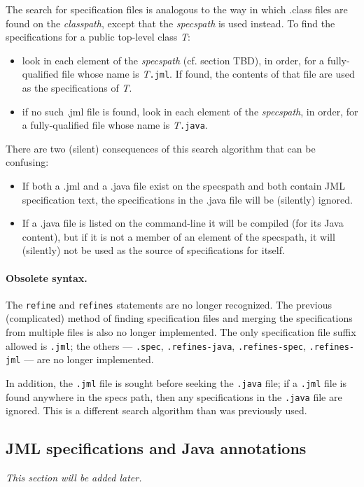 The search for specification files is analogous to the way in  which .class files are found on the {\it classpath}, except that the {\it specspath} is used instead. To find the specifications for a public top-level class {\it T}:
\begin{itemize} 
\item look in each element of the {\it specspath} (cf. section TBD), in order, for a fully-qualified file whose name is {\it T}{\tt .jml}.
If found, the contents of that file are used as the specifications of {\it T}.
\item if no such .jml file is found, look in each element of the {\it specspath}, in order, for a fully-qualified file whose name is {\it T}{\tt .java}.
\end{itemize}
There are two (silent) consequences of this search algorithm that can be confusing:
\begin{itemize}
\item If both a .jml and a .java file exist on the specspath and both contain JML specification text, the specifications in the .java file will be (silently) ignored.
\item If a .java file is listed on the command-line it will be compiled (for its Java content), but if it is not a member of an element of the specspath, it will (silently) not be used as the source of specifications for itself.
\end{itemize}

\paragraph{Obsolete syntax.} The {\tt refine} and {\tt refines} statements are no longer recognized.
The previous (complicated) method of finding specification files and merging the specifications
from multiple files is also no longer implemented. The only specification file suffix allowed is 
{\tt .jml}; the others --- {\tt .spec}, {\tt .refines-java}, {\tt .refines-spec}, {\tt .refines-jml} --- 
are no longer implemented.

In addition, the {\tt .jml} file is sought before seeking the {\tt .java} file; if a {\tt .jml}
file is found anywhere in the specs path, then any specifications in the {\tt .java} file are 
ignored. This is a different search algorithm than was previously used.

\subsection{JML specifications and Java annotations}
\textit{This section will be added later.} %

